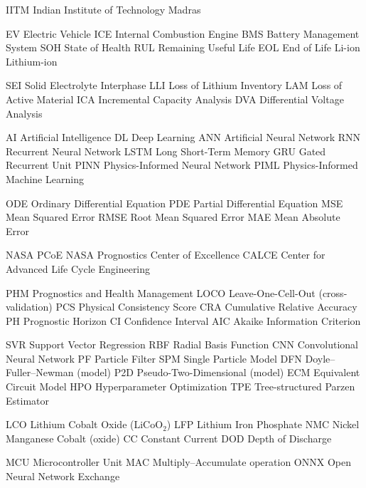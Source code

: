 {IITM} {Indian Institute of Technology Madras}

 {EV} {Electric Vehicle}
 {ICE} {Internal Combustion Engine}
 {BMS} {Battery Management System}
 {SOH} {State of Health}
 {RUL} {Remaining Useful Life}
 {EOL} {End of Life}
 {Li-ion} {Lithium-ion}

 {SEI} {Solid Electrolyte Interphase}
 {LLI} {Loss of Lithium Inventory}
 {LAM} {Loss of Active Material}
 {ICA} {Incremental Capacity Analysis}
 {DVA} {Differential Voltage Analysis}

 {AI} {Artificial Intelligence}
 {DL} {Deep Learning}
 {ANN} {Artificial Neural Network}
 {RNN} {Recurrent Neural Network}
 {LSTM} {Long Short-Term Memory}
 {GRU} {Gated Recurrent Unit}
 {PINN} {Physics-Informed Neural Network}
 {PIML} {Physics-Informed Machine Learning}

 {ODE} {Ordinary Differential Equation}
 {PDE} {Partial Differential Equation}
 {MSE} {Mean Squared Error}
 {RMSE} {Root Mean Squared Error}
 {MAE} {Mean Absolute Error}

 {NASA PCoE} {NASA Prognostics Center of Excellence}
 {CALCE} {Center for Advanced Life Cycle Engineering}

 {PHM} {Prognostics and Health Management}
 {LOCO} {Leave-One-Cell-Out (cross-validation)}
 {PCS} {Physical Consistency Score}
 {CRA} {Cumulative Relative Accuracy}
 {PH} {Prognostic Horizon}
 {CI} {Confidence Interval}
 {AIC} {Akaike Information Criterion}

 {SVR} {Support Vector Regression}
 {RBF} {Radial Basis Function}
 {CNN} {Convolutional Neural Network}
 {PF} {Particle Filter}
 {SPM} {Single Particle Model}
 {DFN} {Doyle--Fuller--Newman (model)}
 {P2D} {Pseudo-Two-Dimensional (model)}
 {ECM} {Equivalent Circuit Model}
 {HPO} {Hyperparameter Optimization}
 {TPE} {Tree-structured Parzen Estimator}

 {LCO} {Lithium Cobalt Oxide (LiCoO$_2$)}
 {LFP} {Lithium Iron Phosphate}
 {NMC} {Nickel Manganese Cobalt (oxide)}
 {CC} {Constant Current}
 {DOD} {Depth of Discharge}

 {MCU} {Microcontroller Unit}
 {MAC} {Multiply--Accumulate operation}
 {ONNX} {Open Neural Network Exchange}